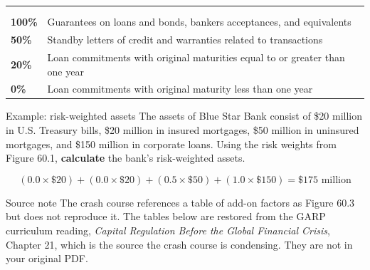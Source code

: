 \noindent\begin{minipage}{\textwidth}
\renewcommand{\arraystretch}{1.32}
\begin{tabularx}{\textwidth}{@{}L{0.20\textwidth}Y@{}}
\\
  & \\
{\tabfont \textbf{100\%}} & {\tabfont Guarantees on loans and bonds, bankers acceptances, and equivalents}\\
{\tabfont \textbf{50\%}} & {\tabfont Standby letters of credit and warranties related to transactions}\\
{\tabfont \textbf{20\%}} & {\tabfont Loan commitments with original maturities equal to or greater than one year}\\
{\tabfont \textbf{0\%}} & {\tabfont Loan commitments with original maturity less than one year}\\
\end{tabularx}
\end{minipage}

\begin{orexambox}{Example: risk-weighted assets}
The assets of Blue Star Bank consist of \$20 million in U.S. Treasury bills, \$20
million in insured mortgages, \$50 million in uninsured mortgages, and \$150
million in corporate loans. Using the risk weights from Figure 60.1,
\textbf{calculate} the bank's risk-weighted assets.

\vspace{6pt}
\par
\[
(0.0\times\$20)+(0.0\times\$20)+(0.5\times\$50)+(1.0\times\$150)=\$175\text{ million}
\]
\end{orexambox}

\begin{ornotebox}{Source note}
The crash course references a table of add-on factors as Figure 60.3 but does not
reproduce it. The tables below are restored from the GARP curriculum reading,
\emph{Capital Regulation Before the Global Financial Crisis}, Chapter 21, which is
the source the crash course is condensing. They are not in your original PDF.
\end{ornotebox}

